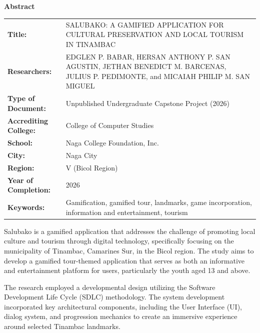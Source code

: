 \documentclass{research}
\newcommand{\frontmattertitle}[1]{%
  \begin{center}
    {\normalsize\bfseries #1}\par
  \end{center}
  \vspace{1.25em}
}
\begin{document}
\clearpage

\chapter*{}
\frontmattertitle{Abstract}

\noindent
\begin{tabularx}{\textwidth}{@{}lX@{}}
  \textbf{Title:}               & SALUBAKO: A GAMIFIED APPLICATION FOR CULTURAL PRESERVATION AND LOCAL TOURISM IN TINAMBAC \\[0.4em]
  \textbf{Researchers:}         & EDGLEN P. BABAR, HERSAN ANTHONY P. SAN AGUSTIN, JETHAN BENEDICT M. BARCENAS, JULIUS P. PEDIMONTE, and MICAIAH PHILIP M. SAN MIGUEL \\[0.4em]
  \textbf{Type of Document:}    & Unpublished Undergraduate Capstone Project (2026) \\[0.4em]
  \textbf{Accrediting College:} & College of Computer Studies \\[0.4em]
  \textbf{School:}              & Naga College Foundation, Inc. \\[0.4em]
  \textbf{City:}                & Naga City \\[0.4em]
  \textbf{Region:}              & V (Bicol Region) \\[0.4em]
  \textbf{Year of Completion:}  & 2026 \\[0.4em]
  \textbf{Keywords:}            & Gamification, gamified tour, landmarks, game incorporation, information and entertainment, tourism \\
\end{tabularx}

\vspace{1em}

Salubako is a gamified application that addresses the challenge of promoting local
culture and tourism through digital technology, specifically focusing on the municipality
of Tinambac, Camarines Sur, in the Bicol region. The study aims to develop a gamified
tour-themed application that serves as both an informative and entertainment platform
for users, particularly the youth aged 13 and above.

The research employed a developmental design utilizing the Software Development
Life Cycle (SDLC) methodology. The system development incorporated key architectural
components, including the User Interface (UI), dialog system, and progression mechanics
to create an immersive experience around selected Tinambac landmarks.
\end{document}
